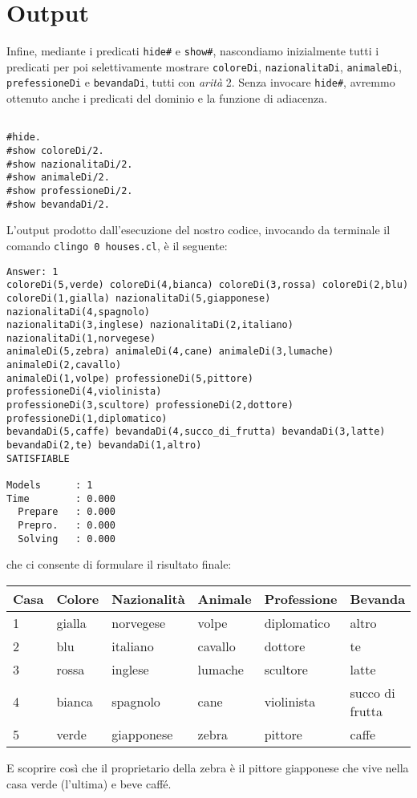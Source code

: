 \section{Output}
Infine, mediante i predicati \texttt{hide\#} e \texttt{show\#}, nascondiamo inizialmente tutti i predicati per poi selettivamente mostrare \texttt{coloreDi}, \texttt{nazionalitaDi}, \texttt{animaleDi}, \texttt{prefessioneDi} e \texttt{bevandaDi}, tutti con \emph{arità} 2. Senza invocare \texttt{hide\#}, avremmo ottenuto anche i predicati del dominio e la funzione di adiacenza.
\begin{lstlisting}[frame=tb]
%% Output

#hide.
#show coloreDi/2.
#show nazionalitaDi/2.
#show animaleDi/2.
#show professioneDi/2.
#show bevandaDi/2.
\end{lstlisting}
L'output prodotto dall'esecuzione del nostro codice, invocando da terminale il comando \texttt{clingo 0 houses.cl}, è il seguente:
\footnotesize{\begin{verbatim}
Answer: 1
coloreDi(5,verde) coloreDi(4,bianca) coloreDi(3,rossa) coloreDi(2,blu)
coloreDi(1,gialla) nazionalitaDi(5,giapponese) nazionalitaDi(4,spagnolo)
nazionalitaDi(3,inglese) nazionalitaDi(2,italiano) nazionalitaDi(1,norvegese)
animaleDi(5,zebra) animaleDi(4,cane) animaleDi(3,lumache) animaleDi(2,cavallo)
animaleDi(1,volpe) professioneDi(5,pittore) professioneDi(4,violinista)
professioneDi(3,scultore) professioneDi(2,dottore) professioneDi(1,diplomatico)
bevandaDi(5,caffe) bevandaDi(4,succo_di_frutta) bevandaDi(3,latte)
bevandaDi(2,te) bevandaDi(1,altro) 
SATISFIABLE

Models      : 1    
Time        : 0.000
  Prepare   : 0.000
  Prepro.   : 0.000
  Solving   : 0.000
\end{verbatim}}
che ci consente di formulare il risultato finale:
\begin{center}
    \begin{tabular}{| l | l | l | l | l | l |} \hline
    \textbf{Casa} & \textbf{Colore} & \textbf{Nazionalità} & \textbf{Animale} & \textbf{Professione} & \textbf{Bevanda}\\ \hline
    1       & gialla    & norvegese     & volpe     & diplomatico   & altro             \\ \hline
    2       & blu       & italiano      & cavallo   & dottore       & te                \\ \hline
    3       & rossa     & inglese       & lumache   & scultore      & latte             \\ \hline
    4       & bianca    & spagnolo      & cane      & violinista    & succo di frutta   \\ \hline
    5       & verde     & giapponese    & zebra     & pittore       & caffe             \\ \hline
    \end{tabular}
\end{center}
E scoprire così che il proprietario della zebra è il pittore giapponese che vive nella casa verde (l'ultima) e beve caffé.

